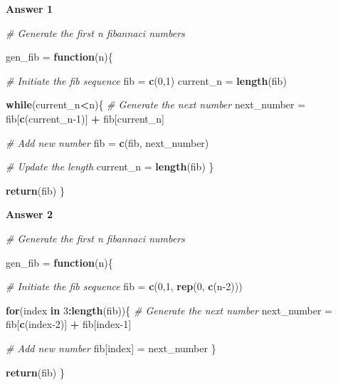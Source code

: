 \documentclass[
]{book}
\newenvironment{Shaded}{\begin{snugshade}}{\end{snugshade}}
\newcommand{\CommentTok}[1]{\textcolor[rgb]{0.56,0.35,0.01}{\textit{#1}}}
\newcommand{\ControlFlowTok}[1]{\textcolor[rgb]{0.13,0.29,0.53}{\textbf{#1}}}
\newcommand{\DecValTok}[1]{\textcolor[rgb]{0.00,0.00,0.81}{#1}}
\newcommand{\KeywordTok}[1]{\textcolor[rgb]{0.13,0.29,0.53}{\textbf{#1}}}
\newcommand{\NormalTok}[1]{#1}
\newcommand{\OperatorTok}[1]{\textcolor[rgb]{0.81,0.36,0.00}{\textbf{#1}}}
\newcommand{\StringTok}[1]{\textcolor[rgb]{0.31,0.60,0.02}{#1}}
\begin{document}
\textbf{Answer 1}

\begin{Shaded}
\begin{Highlighting}[]
\CommentTok{# Generate the first n fibannaci numbers}

\NormalTok{gen_fib =}\StringTok{ }\ControlFlowTok{function}\NormalTok{(n)\{}

  \CommentTok{# Initiate the fib sequence }
\NormalTok{  fib =}\StringTok{ }\KeywordTok{c}\NormalTok{(}\DecValTok{0}\NormalTok{,}\DecValTok{1}\NormalTok{)}
\NormalTok{  current_n =}\StringTok{ }\KeywordTok{length}\NormalTok{(fib)}
  
  \ControlFlowTok{while}\NormalTok{(current_n}\OperatorTok{<}\NormalTok{n)\{}
    \CommentTok{# Generate the next number }
\NormalTok{    next_number =}\StringTok{ }\NormalTok{fib[}\KeywordTok{c}\NormalTok{(current_n}\DecValTok{-1}\NormalTok{)] }\OperatorTok{+}\StringTok{ }\NormalTok{fib[current_n]}
    
    \CommentTok{# Add new number }
\NormalTok{    fib =}\StringTok{ }\KeywordTok{c}\NormalTok{(fib, next_number)}
    
    \CommentTok{# Update the length }
\NormalTok{    current_n =}\StringTok{ }\KeywordTok{length}\NormalTok{(fib)}
\NormalTok{  \}}
  
  \KeywordTok{return}\NormalTok{(fib)}
\NormalTok{\}}
\end{Highlighting}
\end{Shaded}

\textbf{Answer 2}

\begin{Shaded}
\begin{Highlighting}[]
\CommentTok{# Generate the first n fibannaci numbers}

\NormalTok{gen_fib =}\StringTok{ }\ControlFlowTok{function}\NormalTok{(n)\{}

  \CommentTok{# Initiate the fib sequence}
\NormalTok{  fib =}\StringTok{ }\KeywordTok{c}\NormalTok{(}\DecValTok{0}\NormalTok{,}\DecValTok{1}\NormalTok{, }\KeywordTok{rep}\NormalTok{(}\DecValTok{0}\NormalTok{, }\KeywordTok{c}\NormalTok{(n}\DecValTok{-2}\NormalTok{)))}
  
  \ControlFlowTok{for}\NormalTok{(index }\ControlFlowTok{in} \DecValTok{3}\OperatorTok{:}\KeywordTok{length}\NormalTok{(fib))\{}
    \CommentTok{# Generate the next number }
\NormalTok{    next_number =}\StringTok{ }\NormalTok{fib[}\KeywordTok{c}\NormalTok{(index}\DecValTok{-2}\NormalTok{)] }\OperatorTok{+}\StringTok{ }\NormalTok{fib[index}\DecValTok{-1}\NormalTok{]}
    
    \CommentTok{# Add new number }
\NormalTok{    fib[index] =}\StringTok{ }\NormalTok{next_number}
\NormalTok{  \}}
  
  \KeywordTok{return}\NormalTok{(fib)}
\NormalTok{\}}
\end{Highlighting}
\end{Shaded}
\end{document}
